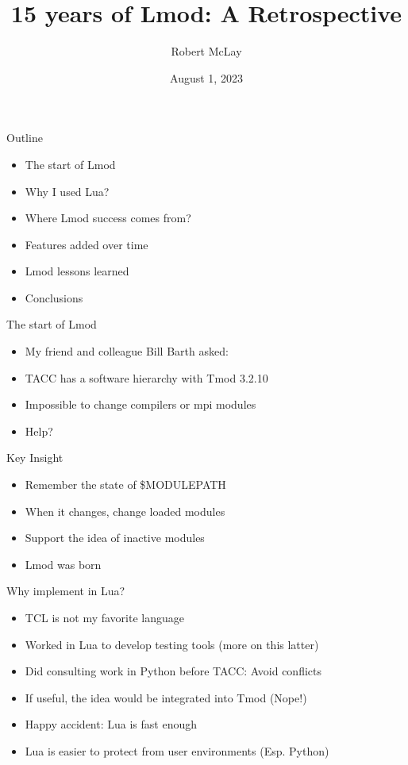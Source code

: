 \documentclass{beamer}
\begin{document}
\title[Lmod]{15 years of Lmod: A Retrospective}
\author{Robert McLay} 
\date{August 1, 2023}

\frame{\titlepage} 


\begin{frame}{Outline}
  \begin{itemize}
    \item The start of Lmod
    \item Why I used Lua?
    \item Where Lmod success comes from?
    \item Features added over time
    \item Lmod lessons learned
    \item Conclusions
  \end{itemize}
\end{frame}

\begin{frame}{The start of Lmod}
  \begin{itemize}
    \item My friend and colleague Bill Barth asked:
    \item TACC has a software hierarchy with Tmod 3.2.10
    \item Impossible to change compilers or mpi modules
    \item Help?
  \end{itemize}
\end{frame}

\begin{frame}{Key Insight}
  \begin{itemize}
    \item Remember the state of \$MODULEPATH
    \item When it changes, change loaded modules
    \item Support the idea of inactive modules
    \item Lmod was born
  \end{itemize}
\end{frame}

\begin{frame}{Why implement in Lua?}
  \begin{itemize}
    \item TCL is not my favorite language
    \item Worked in Lua to develop testing tools (more on this latter)
    \item Did consulting work in Python before TACC: Avoid conflicts
    \item If useful, the idea would be integrated into Tmod (Nope!)
    \item Happy accident: Lua is fast enough
    \item Lua is easier to protect from user environments (Esp. Python)
  \end{itemize}
\end{frame}
\end{document}
